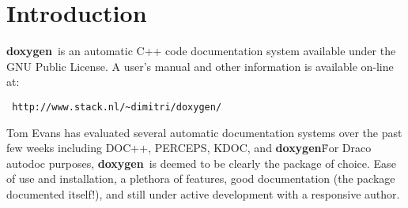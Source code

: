 \documentclass[11pt]{nmemo}
\newcommand{\doxy}{{\normalfont\bfseries doxygen}}
\begin{document}
\section{Introduction}

\doxy\ is an automatic C++ code documentation system available under
the GNU Public License. 
 A user's manual and other information is available on-line at:
\begin{verbatim} http://www.stack.nl/~dimitri/doxygen/ \end{verbatim}

Tom Evans has evaluated several automatic documentation systems over
the past few weeks including DOC++, PERCEPS, KDOC, and \doxy\. 
For Draco autodoc purposes, \doxy\ is deemed to be clearly the 
package of choice. Ease of use and installation, a plethora of features,
good documentation (the package documented itself!), and still
under active development with a responsive author.
\end{document}
